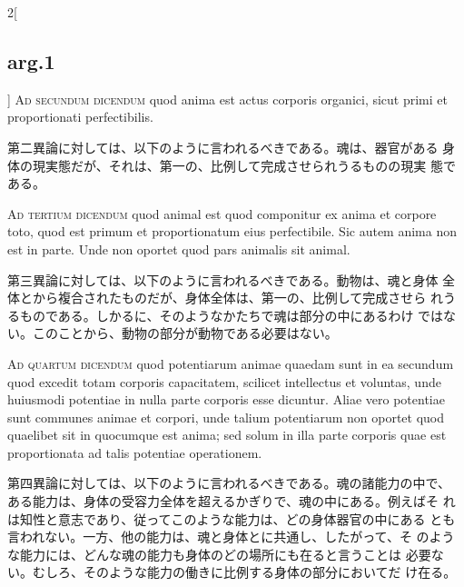 \documentclass[paper=a4paper,fontsize=10pt,jafontsize=9pt,titlepage]{jlreq}
\begin{document}
\begin{paracol}{2}[\subsection{arg.1}]
 {\scshape Ad secundum dicendum} quod anima est actus corporis
 organici, sicut primi et proportionati perfectibilis.

 \switchcolumn

 第二異論に対しては、以下のように言われるべきである。魂は、器官がある
 身体の現実態だが、それは、第一の、比例して完成させられうるものの現実
 態である。

\switchcolumn*[\subsection{ad 3}]



 {\scshape Ad tertium dicendum} quod animal est quod componitur ex
 anima et corpore toto, quod est primum et proportionatum eius
 perfectibile. Sic autem anima non est in parte. Unde non oportet quod
 pars animalis sit animal.

 \switchcolumn

 第三異論に対しては、以下のように言われるべきである。動物は、魂と身体
 全体とから複合されたものだが、身体全体は、第一の、比例して完成させら
 れうるものである。しかるに、そのようなかたちで魂は部分の中にあるわけ
 ではない。このことから、動物の部分が動物である必要はない。

\switchcolumn*[\subsection{ad 4}]



 {\scshape Ad quartum dicendum} quod potentiarum animae quaedam sunt
 in ea secundum quod excedit totam corporis capacitatem, scilicet
 intellectus et voluntas, unde huiusmodi potentiae in nulla parte
 corporis esse dicuntur. Aliae vero potentiae sunt communes animae et
 corpori, unde talium potentiarum non oportet quod quaelibet sit in
 quocumque est anima; sed solum in illa parte corporis quae est
 proportionata ad talis potentiae operationem.

 \switchcolumn

 第四異論に対しては、以下のように言われるべきである。魂の諸能力の中で、
 ある能力は、身体の受容力全体を超えるかぎりで、魂の中にある。例えばそ
 れは知性と意志であり、従ってこのような能力は、どの身体器官の中にある
 とも言われない。一方、他の能力は、魂と身体とに共通し、したがって、そ
 のような能力には、どんな魂の能力も身体のどの場所にも在ると言うことは
 必要ない。むしろ、そのような能力の働きに比例する身体の部分においてだ
 け在る。


\end{paracol}
\end{document}
